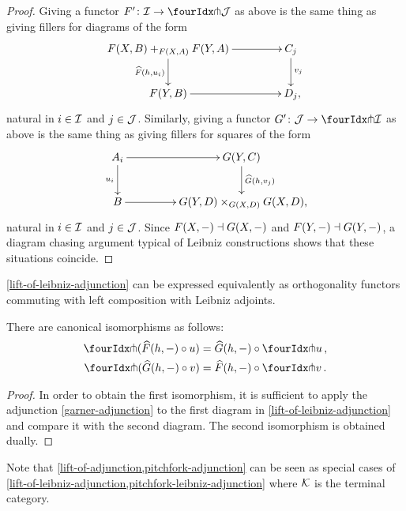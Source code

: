 \documentclass[reqno,10pt,a4paper,oneside]{amsart}
\begin{document}
\begin{proof}
Giving a functor $F' \co \cal{I} \to \liftl{\cal{J}}$ as above is the same thing as giving fillers for diagrams of the form
\[
\xymatrix@C+2em{
  F(X,B) +_{F(X,A)} F(Y,A)
  \ar[d]_{\widehat{F}(h, u_i)}
  \ar[r]
&
  C_j
  \ar[d]^{v_j}
\\
  F(Y, B)
  \ar[r]
&
  D_j \rlap{,}
}
\]
natural in $i \in \cal{I}$ and $j \in \cal{J}$.
Similarly, giving a functor $G' \co \cal{J} \to \liftl{\cal{I}}$ as above is the same thing as giving fillers for squares of the form
\[
\xymatrix@C+2em{
  A_i
  \ar[d]_{u_i}
  \ar[r]
&
  G(Y, C)
  \ar[d]^{\widehat{G}(h, v_j)}
\\
  B
  \ar[r]
&
  G(Y,D) \times_{G(X,D)} G(X,D) \rlap{,}
}
\]
natural in $i \in \cal{I}$ and $j \in \cal{J}$.
Since $F(X, \arghole) \dashv G(X, \arghole)$ and $F(Y, \arghole) \dashv G(Y, \arghole)$, a diagram chasing argument typical of Leibniz constructions shows that these situations coincide.
\end{proof}

\cref{lift-of-leibniz-adjunction} can be expressed equivalently as orthogonality functors commuting with left composition with Leibniz adjoints.

\begin{corollary} \label{pitchfork-leibniz-adjunction} There are canonical isomorphisms as follows:
\begin{align*}
  \liftr{(\widehat{F}(h, -) \cc u)} &= \widehat{G}(h, -) \cc \liftr{u}
\, ,\\
  \liftl{(\widehat{G}(h, -) \cc v)} &= \widehat{F}(h, -) \cc \liftl{v}
\, .
\end{align*}
\end{corollary}

\begin{proof}
In order to obtain the first isomorphism, it is sufficient to apply the adjunction \eqref{garner-adjunction} to the first diagram in \cref{lift-of-leibniz-adjunction} and compare it with the second diagram.
The second isomorphism is obtained dually.
\end{proof}

Note that \cref{lift-of-adjunction,pitchfork-adjunction} can be seen as special cases of \cref{lift-of-leibniz-adjunction,pitchfork-leibniz-adjunction} where $\cal{K}$ is the terminal category.
\end{document}
